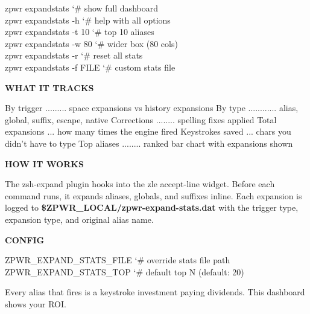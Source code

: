 \documentclass[11pt,a4paper,twoside]{book}
\begin{document}
\begin{codebox}
\color{neongreen}zpwr expandstats            {\char`\#} show full dashboard\\
\color{neongreen}zpwr expandstats -h         {\char`\#} help with all options\\
\color{neongreen}zpwr expandstats -t 10      {\char`\#} top 10 aliases\\
\color{neongreen}zpwr expandstats -w 80      {\char`\#} wider box (80 cols)\\
\color{neongreen}zpwr expandstats -r         {\char`\#} reset all stats\\
\color{neongreen}zpwr expandstats -f FILE    {\char`\#} custom stats file\\
\end{codebox}


\vspace{12pt}
{\bfseries\color{neonyellow} WHAT IT TRACKS}\vspace{4pt}

By trigger ......... space expansions vs history expansions By type ............ alias, global, suffix, escape, native Corrections ........ spelling fixes applied Total expansions ... how many times the engine fired Keystrokes saved ... chars you didn't have to type Top aliases ........ ranked bar chart with expansions shown


\vspace{12pt}
{\bfseries\color{neonyellow} HOW IT WORKS}\vspace{4pt}

The zsh-expand plugin hooks into the zle accept-line widget. Before each command runs, it expands aliases, globals, and suffixes inline. Each expansion is logged to \textbf{\$ZPWR\_LOCAL/zpwr-expand-stats.dat} with the trigger type, expansion type, and original alias name.


\vspace{12pt}
{\bfseries\color{neonyellow} CONFIG}\vspace{4pt}

\begin{codebox}
\color{neongreen}ZPWR\_EXPAND\_STATS\_FILE     {\char`\#} override stats file path\\
\color{neongreen}ZPWR\_EXPAND\_STATS\_TOP      {\char`\#} default top N (default: 20)\\
\end{codebox}

Every alias that fires is a keystroke investment paying dividends. This dashboard shows your ROI.
\end{document}
